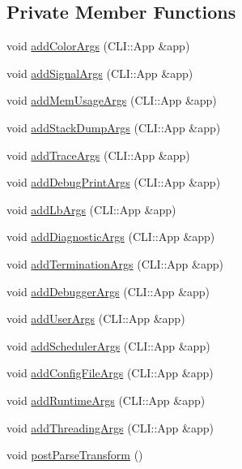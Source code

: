 \subsection*{Private Member Functions}
\begin{DoxyCompactItemize}
\item 
void \hyperlink{structvt_1_1arguments_1_1_arg_config_a88f975427c3408ac8ada2add79fb9692}{add\+Color\+Args} (C\+L\+I\+::\+App \&app)
\item 
void \hyperlink{structvt_1_1arguments_1_1_arg_config_ac8c405111103fc7bef367cce277235d4}{add\+Signal\+Args} (C\+L\+I\+::\+App \&app)
\item 
void \hyperlink{structvt_1_1arguments_1_1_arg_config_aef7cb73c09dd2f554a550c2ab54b66f0}{add\+Mem\+Usage\+Args} (C\+L\+I\+::\+App \&app)
\item 
void \hyperlink{structvt_1_1arguments_1_1_arg_config_a0606d4951d3320d9489e65fccc1ab98b}{add\+Stack\+Dump\+Args} (C\+L\+I\+::\+App \&app)
\item 
void \hyperlink{structvt_1_1arguments_1_1_arg_config_ab3de7d531bd7f09c7ea1b37c9e57a02f}{add\+Trace\+Args} (C\+L\+I\+::\+App \&app)
\item 
void \hyperlink{structvt_1_1arguments_1_1_arg_config_afbe3ad33df89d6f702afa1b6e402e9a8}{add\+Debug\+Print\+Args} (C\+L\+I\+::\+App \&app)
\item 
void \hyperlink{structvt_1_1arguments_1_1_arg_config_a4e1787f38e5ed8f4732b9e27011abd24}{add\+Lb\+Args} (C\+L\+I\+::\+App \&app)
\item 
void \hyperlink{structvt_1_1arguments_1_1_arg_config_a8783b70093b5fb9cae74e97b2c428c44}{add\+Diagnostic\+Args} (C\+L\+I\+::\+App \&app)
\item 
void \hyperlink{structvt_1_1arguments_1_1_arg_config_a0504992629228af199a906edc43b4d0a}{add\+Termination\+Args} (C\+L\+I\+::\+App \&app)
\item 
void \hyperlink{structvt_1_1arguments_1_1_arg_config_ad1c8bc76bc17ffd3245331c5cab90f0c}{add\+Debugger\+Args} (C\+L\+I\+::\+App \&app)
\item 
void \hyperlink{structvt_1_1arguments_1_1_arg_config_aa578460e6783d03ce25e349f8affea99}{add\+User\+Args} (C\+L\+I\+::\+App \&app)
\item 
void \hyperlink{structvt_1_1arguments_1_1_arg_config_ad41d94608d841c18dd302c80ed10c52d}{add\+Scheduler\+Args} (C\+L\+I\+::\+App \&app)
\item 
void \hyperlink{structvt_1_1arguments_1_1_arg_config_a05ce6db9c65585991e2e6e2d741b9dc7}{add\+Config\+File\+Args} (C\+L\+I\+::\+App \&app)
\item 
void \hyperlink{structvt_1_1arguments_1_1_arg_config_a7d5026013c8a56d2684270b0bda83c2b}{add\+Runtime\+Args} (C\+L\+I\+::\+App \&app)
\item 
void \hyperlink{structvt_1_1arguments_1_1_arg_config_a1aa260ad019aa77393ebe557480dfcc0}{add\+Threading\+Args} (C\+L\+I\+::\+App \&app)
\item 
void \hyperlink{structvt_1_1arguments_1_1_arg_config_a688dc6a1e88d8544e2ab41b4db15d8cd}{post\+Parse\+Transform} ()
\end{DoxyCompactItemize}
